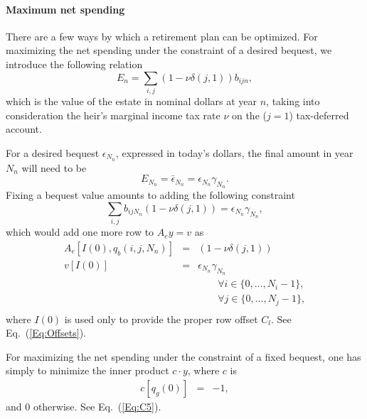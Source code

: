 \documentclass{report}[fleqn,11pt]
\begin{document}
\paragraph*{Maximum net spending}
There are a few ways by which a retirement plan can be optimized. For maximizing the net spending under
the constraint of a desired bequest, we introduce the following relation
\begin{equation}
	\label{Eq:Bequest}
	E_n = \sum_{i,j} (1 - \nu\delta(j, 1)) b_{ijn},
\end{equation}
which is the value of the estate in nominal dollars at year $n$,
taking into consideration the heir's marginal income tax rate $\nu$ on the ($j=1$) tax-deferred account. 

For a desired bequest $\epsilon_{N_n}$, expressed in today's
dollars, the final amount in year $N_n$ will need to be
\begin{equation}
	E_{N_n} = \bar\epsilon_{N_n} = \epsilon_{N_n} \gamma_{N_n}.
\end{equation}
Fixing a bequest value amounts to adding the following constraint
\begin{equation}
	\sum_{i,j} b_{ijN_n} (1 - \nu\delta(j, 1)) = \epsilon_{N_n} \gamma_{N_n},
\end{equation}
which would add one more row to $A_ey = v$ as
\begin{eqnarray}
	A_e[I(0), q_b(i, j, N_n)] &=& (1 - \nu\delta(j, 1)) \nonumber \\
	v[I(0)] &=& \epsilon_{N_n}\gamma_{N_n} \\
	&&\qquad\forall i \in \{0,\ldots, N_i-1\},\nonumber\\
	&&\qquad\forall j \in \{0,\ldots, N_j-1\},\nonumber\\
\end{eqnarray}
where $I(0)$ is used only to provide the proper row offset $C_l$. See Eq.~(\ref{Eq:Offsets}).

For maximizing the net spending under the constraint of a fixed bequest, one has simply to
minimize the inner product $c\cdot y$, where $c$ is
\begin{eqnarray}
	c[q_g(0)] &=& -1,
\end{eqnarray}
and 0 otherwise. See Eq.~(\ref{Eq:C5}).
\end{document}
